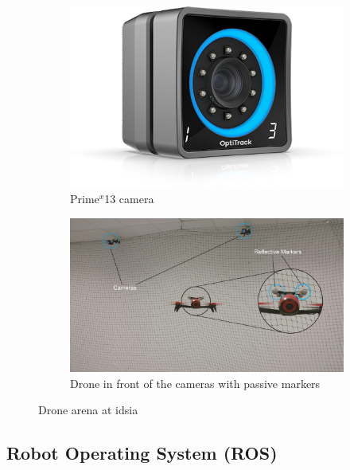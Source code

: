 \begin{figure}[!htb]
	\begin{center}
		\begin{subfigure}[h]{0.29\textwidth}
			\centering
			\includegraphics[width=1\textwidth]{"contents/images/03-optitrack-camera"}
			\caption[]{Prime$^x$13 camera}
			\label{fig:optitrack-camera}
		\end{subfigure}
		\hfill
		\begin{subfigure}[h]{0.69\textwidth}
			\centering
			\includegraphics[width=1\textwidth]{"contents/images/03-arena"}
			\caption[]{Drone in front of the cameras with passive markers}
			\label{fig:drone-arena}
		\end{subfigure}
	\end{center}
	\vspace{-0.5cm}
	\caption[Drone arena at \gls{idsia}]{Drone arena at \gls{idsia}}
\end{figure}



\subsection{Robot Operating System (ROS)}
\label{subsec:ROS}

